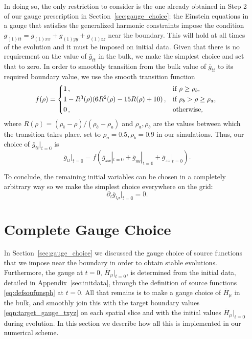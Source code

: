 \documentclass[aps,letterpaper,twocolumn,nofootinbib]{revtex4}
\numberwithin{equation}{section}
\begin{document}
In doing so, the only restriction to consider is the one already obtained in Step 2 of our gauge prescription in Section~\ref{sec:gauge_choice}: the Einstein equations in a gauge that satisfies the generalized harmonic constraints impose the condition $\bar{g}_{(1)tt}=\bar{g}_{(1)xx}+\bar{g}_{(1)yy}+\bar{g}_{(1)zz}$ near the boundary. This will hold at all times of the evolution and it must be imposed on initial data. Given that there is no requirement on the value of $\bar{g}_{tt}$ in the bulk, we make the simplest choice and set that to zero. In order to smoothly transition from the bulk value of $\bar{g}_{tt}$ to its required boundary value, we use the smooth transition function
  \begin{equation}
  \label{eq:transfunc}
    f(\rho) =
    \begin{cases*}
      1\,, & if $\rho\geq \rho_{b}$, \\
      1-R^3(\rho)(6 R^2(\rho)-15 R(\rho)+10)\,, & if $\rho_{b} > \rho\geq\rho_{a}$, \\
      0\,,        & otherwise,
    \end{cases*}
  \end{equation}
where $R(\rho)=(\rho_{b}-\rho)/(\rho_{b}-\rho_{a})$ and $\rho_{a},\rho_{b}$ are the values between which the transition takes place, set to $\rho_{a}=0.5,\rho_{b}=0.9$ in our simulations.
Thus, our choice of $\bar{g}_{tt}|_{t=0}$ is
\begin{equation}
\bar{g}_{tt}\big|_{t=0}=f(\bar{g}_{xx}|_{t=0}+\bar{g}_{yy}|_{t=0}+\bar{g}_{zz}|_{t=0}).
\end{equation}

To conclude, the remaining initial variables can be chosen in a completely arbitrary way so we make the simplest choice everywhere on the grid:
\begin{equation}
\partial_t\bar{g}_{t \mu}|_{t=0}=0.
\end{equation}

\section{Complete Gauge Choice}
\label{sec:GCbulk}

In Section~\ref{sec:gauge_choice} we discussed the gauge choice of source functions that we impose near the boundary in order to obtain stable evolutions. Furthermore, the gauge at $t=0$, $\bar{H}_{\mu}|_{t=0}$, is determined from the initial data, detailed in Appendix~\ref{sec:initdata}, through the definition of source functions \eqref{eq:defsoufunsph} at $t=0$. All that remains is to make a gauge choice of $\bar{H}_\mu$ in the bulk, and smoothly join this with the target boundary values \eqref{eqn:target_gauge_txyz} on each spatial slice and with the initial values $\bar{H}_{\mu}|_{t=0}$ during evolution. In this section we describe how all this is implemented in our numerical scheme.
\end{document}
